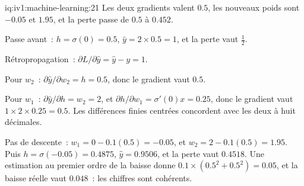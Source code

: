 \begin{solution}{iq:iv1:machine-learning:21}
Les deux gradients valent $0.5$, les nouveaux poids sont $-0.05$ et $1.95$, et la perte passe de $0.5$ à $0.452$.

Passe avant~: $h = \sigma(0) = 0.5$, $\hat{y} = 2 \times 0.5 = 1$, et la perte vaut $\frac12$.

Rétropropagation~: $\partial L/\partial\hat{y} = \hat{y} - y = 1$.

Pour $w_2$~: $\partial\hat{y}/\partial w_2 = h = 0.5$, donc le gradient vaut $0.5$.

Pour $w_1$~: $\partial\hat{y}/\partial h = w_2 = 2$, et $\partial h/\partial w_1 = \sigma'(0)x = 0.25$, donc le gradient vaut $1 \times 2 \times 0.25 = 0.5$. Les différences finies centrées concordent avec les deux à huit décimales.

Pas de descente~: $w_1 = 0 - 0.1(0.5) = -0.05$, et $w_2 = 2 - 0.1(0.5) = 1.95$. Puis $h = \sigma(-0.05) = 0.4875$, $\hat{y} = 0.9506$, et la perte vaut $0.4518$. Une estimation au premier ordre de la baisse donne $0.1 \times (0.5^2 + 0.5^2) = 0.05$, et la baisse réelle vaut $0.048$~: les chiffres sont cohérents.



\end{solution}

